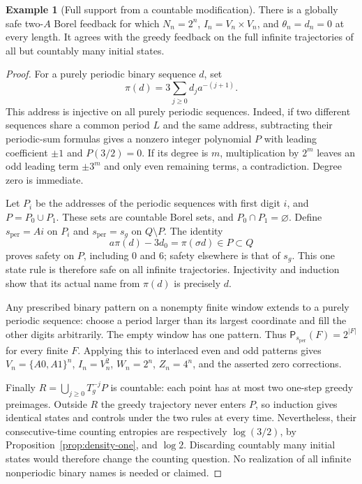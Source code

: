 \documentclass[11pt,reqno]{amsart}
\numberwithin{equation}{section}
\theoremstyle{definition}
\newtheorem{example}[theorem]{Example}
\theoremstyle{definition}
\newcommand{\Patt}{\mathsf P}
\begin{document}
\begin{example}[Full support from a countable modification]
\label{ex:periodic-support}
There is a globally safe two-$A$ Borel feedback for which
$N_n=2^n$, $I_n=V_n\times V_n$, and $\theta_n=d_n=0$ at
every length. It agrees with the greedy feedback on the full
infinite trajectories of all but countably many initial states.
\end{example}
\begin{proof}
For a purely periodic binary sequence $d$, set
\[
 \pi(d)=3\sum_{j\ge0}d_ja^{-(j+1)}.
\]
This address is injective on all purely periodic sequences.
Indeed, if two different sequences share a common period $L$
and the same address, subtracting their periodic-sum formulas
gives a nonzero integer polynomial $P$ with leading coefficient
$\pm1$ and $P(3/2)=0$. If its degree is $m$, multiplication by
$2^m$ leaves an odd leading term $\pm3^m$ and only even
remaining terms, a contradiction. Degree zero is immediate.

Let $P_i$ be the addresses of the periodic sequences with first
digit $i$, and $P=P_0\cup P_1$. These sets are countable Borel
sets, and $P_0\cap P_1=\varnothing$. Define $s_{\mathrm{per}}=Ai$
on $P_i$ and $s_{\mathrm{per}}=s_g$ on $Q\setminus P$. The identity
\[
 a\pi(d)-3d_0=\pi(\sigma d)\in P\subset Q
\]
proves safety on $P$, including $0$ and $6$; safety elsewhere
is that of $s_g$. This one state rule is therefore safe on all
infinite trajectories. Injectivity and induction show that its
actual name from $\pi(d)$ is precisely $d$.

Any prescribed binary pattern on a nonempty finite window extends to a
purely periodic sequence: choose a period larger than its largest
coordinate and fill the other digits arbitrarily. The empty window has
one pattern. Thus
$\Patt_{s_{\mathrm{per}}}(F)=2^{|F|}$ for every finite $F$.
Applying this to interlaced even and odd patterns gives
$V_n=\{A0,A1\}^n$, $I_n=V_n^2$, $W_n=2^n$, $Z_n=4^n$,
and the asserted zero corrections.

Finally $R=\bigcup_{j\ge0}T_g^{-j}P$ is countable: each point
has at most two one-step greedy preimages. Outside $R$ the
greedy trajectory never enters $P$, so induction gives identical
states and controls under the two rules at every time. Nevertheless,
their consecutive-time counting entropies are respectively
$\log(3/2)$, by Proposition~\ref{prop:density-one}, and $\log2$.
Discarding countably many initial states would therefore change
the counting question. No realization of all infinite nonperiodic
binary names is needed or claimed.
\end{proof}
\end{document}
